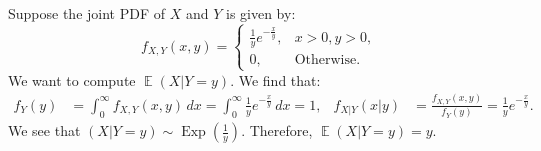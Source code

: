 \documentclass{huhtakm-template-book-v2}
\DeclareMathOperator{\E}{\mathbb{E}}
\DeclareMathOperator{\Exp}{Exp}
\begin{document}
    \begin{eg}
        Suppose the joint PDF of $X$ and $Y$ is given by:
        \begin{equation*}
            f_{X,Y}(x, y) = \begin{cases}
                \frac{1}{y} e^{-\frac{x}{y}}, &x > 0, y > 0,\\
                0, &\text{Otherwise}.
            \end{cases}
        \end{equation*}
        We want to compute $\E(X | Y = y)$. We find that:
        \begin{align*}
            f_{Y}(y) &= \int_{0}^{\infty} f_{X,Y}(x, y) \, dx = \int_{0}^{\infty} \frac{1}{y} e^{-\frac{x}{y}} \, dx = 1, & f_{X|Y}(x|y) &= \frac{f_{X,Y}(x, y)}{f_{Y}(y)} = \frac{1}{y} e^{-\frac{x}{y}}.
        \end{align*}
        We see that $(X | Y = y) \sim \Exp\left(\frac{1}{y}\right)$. Therefore, $\E(X | Y = y) = y$.
    \end{eg}
    \newpage
\end{document}
